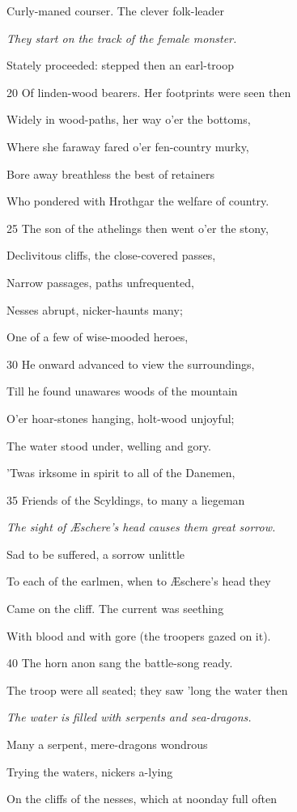 Curly-maned courser. The clever folk-leader

\emph{They start on the
track of the female
monster.}

Stately proceeded: stepped then an earl-troop

20
Of linden-wood bearers. Her footprints were seen then

Widely in wood-paths, her way o’er the bottoms,

Where she faraway fared o’er fen-country murky,

Bore away breathless the best of retainers

Who pondered with Hrothgar the welfare of country.

25
The son of the athelings then went o’er the stony,

Declivitous cliffs, the close-covered passes,

Narrow passages, paths unfrequented,

Nesses abrupt, nicker-haunts many;

One of a few of wise-mooded heroes,

30
He onward advanced to view the surroundings,

Till he found unawares woods of the mountain

O’er hoar-stones hanging, holt-wood unjoyful;

The water stood under, welling and gory.

’Twas irksome in spirit to all of the Danemen,

35
Friends of the Scyldings, to many a liegeman

\emph{The sight of
Æschere’s head
causes them great
sorrow.}

Sad to be suffered, a sorrow unlittle

To each of the earlmen, when to Æschere’s head they

Came on the cliff. The current was seething

With blood and with gore (the troopers gazed on it).

40
The horn anon sang the battle-song ready.

The troop were all seated; they saw ’long the water then

\emph{The water is filled
with serpents and
sea-dragons.}

Many a serpent, mere-dragons wondrous

Trying the waters, nickers a-lying

On the cliffs of the nesses, which at noonday full often

